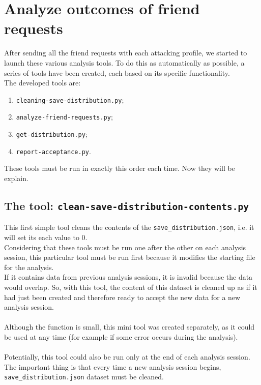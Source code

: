 \section{Analyze outcomes of friend requests}
After sending all the friend requests with each attacking profile, we started to launch these various analysis tools.
To do this as automatically as possible, a series of tools have been created, each based on its specific functionality.
\\The developed tools are:
\begin{enumerate}
	\item \texttt{cleaning-save-distribution.py};
	\item \texttt{analyze-friend-requests.py};
	\item \texttt{get-distribution.py};
	\item \texttt{report-acceptance.py}.
\end{enumerate}
These tools must be run in exactly this order each time. Now they will be explain.
\subsection{The tool: \texttt{clean-save-distribution-contents.py}}
This first simple tool cleans the contents of the \texttt{save\_distribution.json}, i.e. it will set its each value to 0.\\
Considering that these tools must be run one after the other on each analysis session, this particular tool must be run first because it modifies the starting file for the analysis.\\
If it contains data from previous analysis sessions, it is invalid because the data would overlap. So, with this tool, the content of this dataset is cleaned up as if it had just been created and therefore ready to accept the new data for a new analysis session.\\\\
Although the function is small, this mini tool was created separately, as it could be used at any time (for example if some error occurs during the analysis).\\\\
Potentially, this tool could also be run only at the end of each analysis session. The important thing is that every time a new analysis session begins, \texttt{save\_distribution.json} dataset must be cleaned.

